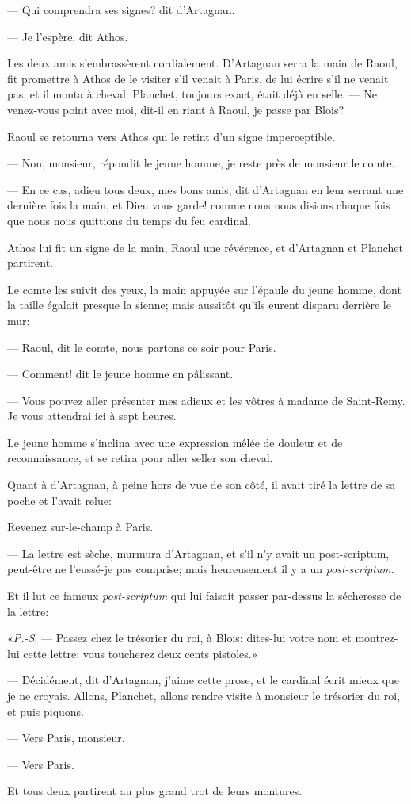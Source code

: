 — Qui comprendra ses signes? dit d'Artagnan.

— Je l'espère, dit Athos.

Les deux amis s'embrassèrent cordialement. D'Artagnan serra la main de Raoul, fit promettre à Athos de le visiter s'il venait à
Paris, de lui écrire s'il ne venait pas, et il monta à cheval. Planchet, toujours exact, était déjà en selle.
— Ne venez-vous point avec moi, dit-il en riant à Raoul, je passe par Blois?

Raoul se retourna vers Athos qui le retint d'un signe imperceptible.

— Non, monsieur, répondit le jeune homme, je reste près de monsieur le comte.

— En ce cas, adieu tous deux, mes bons amis, dit d'Artagnan en leur serrant une dernière fois la main, et Dieu vous garde! comme nous nous disions chaque fois que nous nous quittions du temps du feu cardinal.

Athos lui fit un signe de la main, Raoul une révérence, et d'Artagnan et Planchet partirent.

Le comte les suivit des yeux, la main appuyée sur l'épaule du jeune homme, dont la taille égalait presque la sienne; mais aussitôt qu'ils eurent disparu derrière le mur:

— Raoul, dit le comte, nous partons ce soir pour Paris.

— Comment! dit le jeune homme en pâlissant.

— Vous pouvez aller présenter mes adieux et les vôtres à madame de Saint-Remy. Je vous attendrai ici à sept heures.

Le jeune homme s'inclina avec une expression mêlée de douleur et de reconnaissance, et se retira pour aller seller son cheval.

Quant à d'Artagnan, à peine hors de vue de son côté, il avait tiré la lettre de sa poche et l'avait relue:

\begin{mail}{}{}
Revenez sur-le-champ à Paris.
\end{mail}

— La lettre est sèche, murmura d'Artagnan, et s'il n'y avait un post-scriptum, peut-être ne l'eussé-je pas comprise; mais heureusement il y a un \textit{post-scriptum}.

Et il lut ce fameux \textit{post-scriptum} qui lui faisait passer par-dessus la sécheresse de la lettre:

«\textit{P.-S}. — Passez chez le trésorier du roi, à Blois: dites-lui votre nom et montrez-lui cette lettre: vous toucherez deux cents pistoles.»

— Décidément, dit d'Artagnan, j'aime cette prose, et le cardinal écrit mieux que je ne croyais. Allons, Planchet, allons rendre visite à monsieur le trésorier du roi, et puis piquons.

— Vers Paris, monsieur.

— Vers Paris.

Et tous deux partirent au plus grand trot de leurs montures.